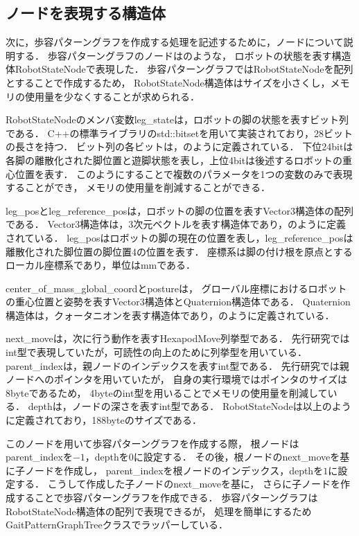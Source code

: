 \newpage

\subsection{ノードを表現する構造体}
次に，歩容パターングラフを作成する処理を記述するために，ノードについて説明する．
歩容パターングラフのノードはのような，
ロボットの状態を表す構造体RobotStateNodeで表現した．
歩容パターングラフではRobotStateNodeを配列とすることで作成するため，
RobotStateNode構造体はサイズを小さくし，メモリの使用量を少なくすることが求められる．

RobotStateNodeのメンバ変数leg\_stateは，ロボットの脚の状態を表すビット列である．
C++の標準ライブラリのstd::bitsetを用いて実装されており，28ビットの長さを持つ．
ビット列の各ビットは，のように定義されている．
下位24bitは各脚の離散化された脚位置と遊脚状態を表し，上位4bitは後述するロボットの重心位置を表す．
このようにすることで複数のパラメータを1つの変数のみで表現することができ，
メモリの使用量を削減することができる．

leg\_posとleg\_reference\_posは，ロボットの脚の位置を表すVector3構造体の配列である．
Vector3構造体は，3次元ベクトルを表す構造体であり，のように定義されている．
leg\_posはロボットの脚の現在の位置を表し，leg\_reference\_posは離散化された脚位置の脚位置4の位置を表す．
座標系は脚の付け根を原点とするローカル座標系であり，単位はmmである．

center\_of\_mass\_global\_coordとpostureは，
グローバル座標におけるロボットの重心位置と姿勢を表すVector3構造体とQuaternion構造体である．
Quaternion構造体は，クォータニオンを表す構造体であり，のように定義されている．

next\_moveは，次に行う動作を表すHexapodMove列挙型である．
先行研究ではint型で表現していたが，可読性の向上のために列挙型を用いている．
parent\_indexは，親ノードのインデックスを表すint型である．
先行研究では親ノードへのポインタを用いていたが，
自身の実行環境ではポインタのサイズは8byteであるため，
4byteのint型を用いることでメモリの使用量を削減している．
depthは，ノードの深さを表すint型である．
RobotStateNodeは以上のように定義されており，188byteのサイズである．

このノードを用いて歩容パターングラフを作成する際，
根ノードはparent\_indexを$-1$，depthを$0$に設定する．
その後，根ノードのnext\_moveを基に子ノードを作成し，
parent\_indexを根ノードのインデックス，depthを$1$に設定する．
こうして作成した子ノードのnext\_moveを基に，
さらに子ノードを作成することで歩容パターングラフを作成できる．
歩容パターングラフはRobotStateNode構造体の配列で表現できるが，
処理を簡単にするためGaitPatternGraphTreeクラスでラッパーしている．

